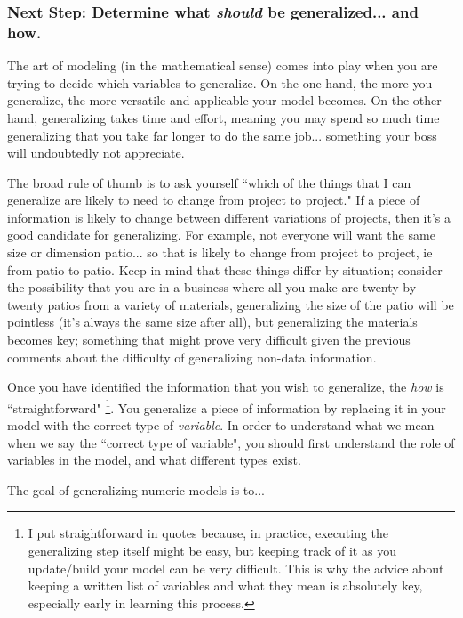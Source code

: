 \documentclass{ximeraXloud}
\begin{document}
\subsubsection*{Next Step: Determine what \emph{should} be generalized... and how.}

    The art of modeling (in the mathematical sense) comes into play when you are trying to decide which variables to generalize. On the one hand, the more you generalize, the more versatile and applicable your model becomes. On the other hand, generalizing takes time and effort, meaning you may spend so much time generalizing that you take far longer to do the same job... something your boss will undoubtedly not appreciate.
    
    The broad rule of thumb is to ask yourself ``which of the things that I can generalize are likely to need to change from project to project." If a piece of information is likely to change between different variations of projects, then it's a good candidate for generalizing. For example, not everyone will want the same size or dimension patio... so that is likely to change from project to project, ie from patio to patio. Keep in mind that these things differ by situation; consider the possibility that you are in a business where all you make are twenty by twenty patios from a variety of materials, generalizing the size of the patio will be pointless (it's always the same size after all), but generalizing the materials becomes key; something that might prove very difficult given the previous comments about the difficulty of generalizing non-data information.
    
    Once you have identified the information that you wish to generalize, the \textit{how} is ``straightforward"
    \footnote{I put straightforward in quotes because, in practice, executing the generalizing step itself might be easy, but keeping track of it as you update/build your model can be very difficult. This is why the advice about keeping a written list of variables and what they mean is absolutely key, especially early in learning this process.}.
    You generalize a piece of information by replacing it in your model with the correct type of \textit{variable}.
    In order to understand what we mean when we say the ``correct type of variable", you should first understand the role of variables in the model, and what different types exist.
    
    
    \begin{question}
        The goal of generalizing numeric models is to...
        \begin{selectAll}
        \end{selectAll}
    \end{question}
\end{document}
